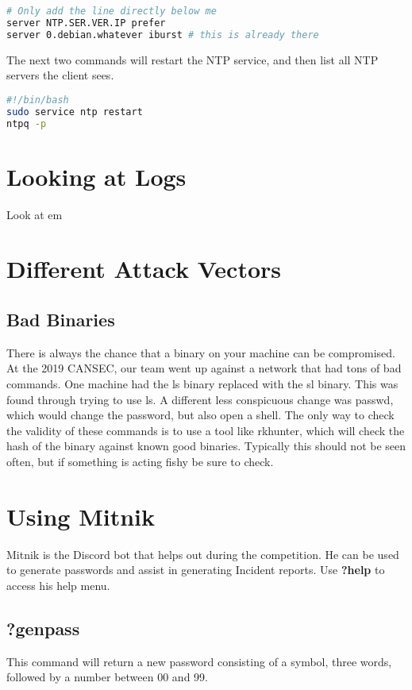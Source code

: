 \documentclass{article}
\begin{document}
\begin{lstlisting}[language=bash]
# Only add the line directly below me
server NTP.SER.VER.IP prefer
server 0.debian.whatever iburst # this is already there
\end{lstlisting}

The next two commands will restart the NTP service, and then list all NTP servers the client sees.

\begin{lstlisting}[language=bash]
#!/bin/bash
sudo service ntp restart
ntpq -p
\end{lstlisting}


\section{Looking at Logs}
Look at em

\section{Different Attack Vectors}

\subsection{Bad Binaries}
There is always the chance that a binary on your machine can be compromised. At the 2019 CANSEC, our team went up against a network that had tons of bad commands. One machine had the ls binary replaced with the sl binary. This was found through trying to use ls. A different less conspicuous change was passwd, which would change the password, but also open a shell.
The only way to check the validity of these commands is to use a tool like rkhunter, which will check the hash of the binary against known good binaries. Typically this should not be seen often, but if something is acting fishy be sure to check.

\section{Using Mitnik}
Mitnik is the Discord bot that helps out during the competition. He can be used to generate passwords and assist in generating Incident reports. Use \textbf{?help} to access his help menu.

\subsection{?genpass}
This command will return a new password consisting of a symbol, three words, followed by a number between 00 and 99. 
\end{document}

